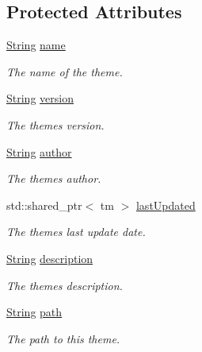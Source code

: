\subsection*{Protected Attributes}
\begin{DoxyCompactItemize}
\item 
\hyperlink{class_rad_j_a_v_1_1_string}{String} \hyperlink{class_rad_j_a_v_1_1_theme_af6fa94694f2e03b411c05e57794c7898}{name}
\begin{DoxyCompactList}\small\item\em The name of the theme. \end{DoxyCompactList}\item 
\hyperlink{class_rad_j_a_v_1_1_string}{String} \hyperlink{class_rad_j_a_v_1_1_theme_a7cd795ecd11078a8416415cee5aec2f3}{version}
\begin{DoxyCompactList}\small\item\em The theme\textquotesingle{}s version. \end{DoxyCompactList}\item 
\hyperlink{class_rad_j_a_v_1_1_string}{String} \hyperlink{class_rad_j_a_v_1_1_theme_adc47f93cb07dbc0ccbd65ad10b85872a}{author}
\begin{DoxyCompactList}\small\item\em The theme\textquotesingle{}s author. \end{DoxyCompactList}\item 
std\+::shared\+\_\+ptr$<$ tm $>$ \hyperlink{class_rad_j_a_v_1_1_theme_a7b0be4a5c8a067898446158325e36615}{last\+Updated}
\begin{DoxyCompactList}\small\item\em The theme\textquotesingle{}s last update date. \end{DoxyCompactList}\item 
\hyperlink{class_rad_j_a_v_1_1_string}{String} \hyperlink{class_rad_j_a_v_1_1_theme_a87b0854f11d9f9ab8e2743933ff1d861}{description}
\begin{DoxyCompactList}\small\item\em The theme\textquotesingle{}s description. \end{DoxyCompactList}\item 
\hyperlink{class_rad_j_a_v_1_1_string}{String} \hyperlink{class_rad_j_a_v_1_1_theme_aa67c5693e612bc33cf9b7b6d7548c4fc}{path}
\begin{DoxyCompactList}\small\item\em The path to this theme. \end{DoxyCompactList}\end{DoxyCompactItemize}



